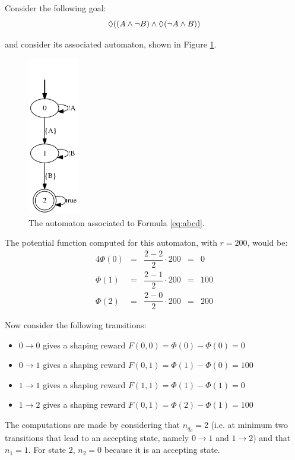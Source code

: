 \begin{example}\label{exa:rs-eve}
	Consider the following \LTLf goal:
	\begin{equation}\label{eq:eve-a!b-eve-!ab}
		\Diamond( (A \wedge \lnot B) \wedge \Diamond(\lnot A \wedge B) )
	\end{equation}
	
	and consider its associated automaton, shown in Figure \ref{fig:eve-a!b-eve-!ab}.
	\begin{figure}[h!]
		\centering
		\includegraphics[width=0.2\textwidth]{images/eve-a!b-eve-!ab}
		\caption{The automaton associated to Formula \ref{eq:abcd}.}
		\label{fig:eve-a!b-eve-!ab}
	\end{figure}
	
	The potential function computed for this automaton, with $r=200$, would be:
	\begin{alignat*}{4}
	\Phi(0) & = & \dfrac{2 - 2}{2}\cdot 200 & = & 0\\
	\Phi(1) & = & \dfrac{2 - 1}{2}\cdot 200 & = & 100\\
	\Phi(2) & = & \dfrac{2 - 0}{2}\cdot 200 & = & 200
	\end{alignat*}
	
	Now consider the following transitions:
	\begin{itemize}
		\item $0\to 0$ gives a shaping reward $F(0, 0) = \Phi(0) - \Phi(0) = 0$
		\item $0\to 1$ gives a shaping reward $F(0, 1) = \Phi(1) - \Phi(0) = 100$
		\item $1\to 1$ gives a shaping reward $F(1, 1) = \Phi(1) - \Phi(1) = 0$
		\item $1\to 2$ gives a shaping reward $F(0, 1) = \Phi(2) - \Phi(1) = 100$
	\end{itemize}
	The computations are made by considering that $n_{q_0} = 2$ (i.e. at minimum two transitions that lead to an accepting state, namely $0\to 1$ and $1\to 2$) and that $n_1=1$. For state $2$, $n_2 = 0$ because it is an accepting state.

	
\end{example}

